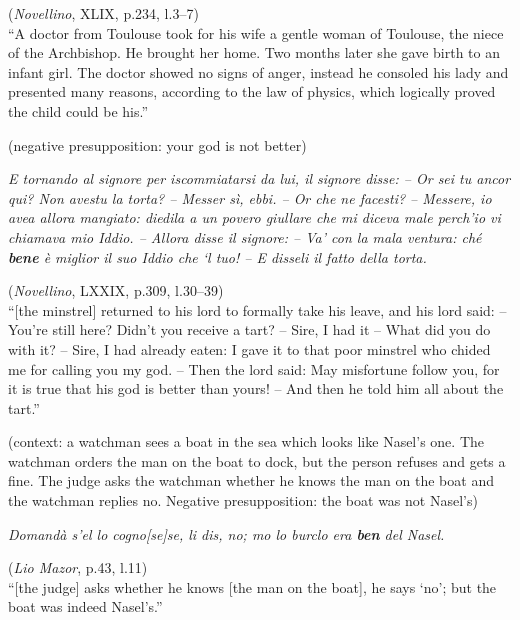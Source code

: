 \documentclass[output=paper]{langsci/langscibook}
\begin{document}
        (\emph{Novellino}, XLIX, p.234, l.3--7)\\
        \enquote{A doctor from Toulouse took for his wife a gentle woman of Toulouse,
        the niece of the Archbishop. He brought her home. Two months later she
        gave birth to an infant girl. The doctor showed no signs of anger,
        instead he consoled his lady and presented many reasons, according to
    the law of physics, which logically proved the child could be his.}
	\z
\z

\ea\label{ex:key:12.8}(negative presupposition: your god is not better)\\
    \begin{italian}\emph{E tornando al signore per iscommiatarsi da lui, il
            signore disse: – Or sei tu ancor qui? Non avestu la torta? – Messer
            sì, ebbi. – Or che ne facesti? – Messere, io avea allora mangiato:
            diedila a un povero giullare che mi diceva male perch’io vi
            chiamava mio Iddio. – Allora disse il signore: – Va’ con la mala
    ventura: ché \textbf{bene} è miglior il suo Iddio che ‘l tuo! – E disseli
    il fatto della torta.}\end{italian}\hfill
    (\emph{Novellino}, LXXIX, p.309, l.30--39)\\
    \enquote{[the minstrel] returned to his lord to formally take his leave,
    and his lord said: -- You’re still here? Didn’t you receive a tart?
    -- Sire, I had it -- What did you do with it? -- Sire, I had already
    eaten: I gave it to that poor minstrel who chided me for calling you my
    god. -- Then the lord said: May misfortune follow you, for it is true that
    his god is better than yours! -- And then he told him all about the tart.}
\z

\ea\label{ex:key:12.9}
    (context: a watchman sees a boat in the sea which looks like Nasel’s one.
    The watchman orders the man on the boat to dock, but the person refuses and
    gets a fine. The judge asks the watchman whether he knows the man on the
    boat and the watchman replies no. Negative presupposition: the boat was not
    Nasel’s)\\
    \begin{italian}\emph{Domandà s’el lo cogno[se]se, li dis, no; mo lo burclo
    era \textbf{ben} del Nasel.}\end{italian}\hfill
	(\emph{Lio Mazor}, p.43, l.11)\\
    \enquote{[the judge] asks whether he knows [the man on the boat], he says
    \enquote*{no}; but the boat was indeed Nasel’s.}
\z
\end{document}
